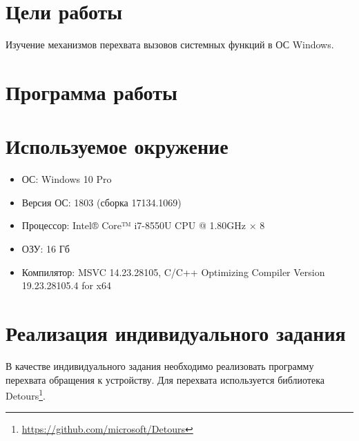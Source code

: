 





\tableofcontents
\newpage

\section{Цели работы}

Изучение механизмов перехвата вызовов системных функций в ОС Windows.

\section{Программа работы}



\section{Используемое окружение}

\begin{itemize}
	\item ОС: Windows 10 Pro
	\item Версия ОС: 1803 (сборка 17134.1069)
	\item Процессор: Intel® Core™ i7-8550U CPU @ 1.80GHz × 8
	\item ОЗУ: 16 Гб
	\item Компилятор: MSVC 14.23.28105, C/C++ Optimizing Compiler Version 19.23.28105.4 for x64
\end{itemize}



\section{Реализация индивидуального задания}

В качестве индивидуального задания необходимо реализовать программу перехвата обращения к устройству. Для перехвата используется библиотека Detours\footnote{\url{https://github.com/microsoft/Detours}}. 

